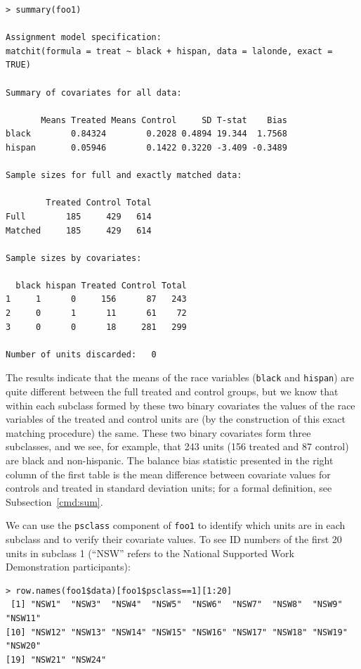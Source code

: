 \documentclass[oneside,letterpaper,titlepage]{article}
\begin{document}
\begin{verbatim}
> summary(foo1)
 
Assignment model specification:
matchit(formula = treat ~ black + hispan, data = lalonde, exact = TRUE)
 
Summary of covariates for all data:
 
       Means Treated Means Control     SD T-stat    Bias
black        0.84324        0.2028 0.4894 19.344  1.7568
hispan       0.05946        0.1422 0.3220 -3.409 -0.3489
  
Sample sizes for full and exactly matched data:
 
        Treated Control Total
Full        185     429   614
Matched     185     429   614
 
Sample sizes by covariates:
 
  black hispan Treated Control Total
1     1      0     156      87   243
2     0      1      11      61    72
3     0      0      18     281   299
 
Number of units discarded:   0
\end{verbatim}
The results indicate that the means of the race variables ({\tt black}
and {\tt hispan}) are quite different between the full treated and
control groups, but we know that within each subclass formed by these
two binary covariates the values of the race variables of the treated
and control units are (by the construction of this exact matching
procedure) the same.  These two binary covariates form three
subclasses, and we see, for example, that 243 units (156 treated and
87 control) are black and non-hispanic.  The balance bias statistic
presented in the right column of the first table is the mean
difference between covariate values for controls and treated in
standard deviation units; for a formal definition, see
Subsection~\ref{cmd:sum}.

We can use the {\tt psclass} component of {\tt foo1} to identify which
units are in each subclass and to verify their covariate values.
To see ID numbers of the first 20 units in subclass 1 (``NSW'' refers
to the National Supported Work Demonstration participants):
\begin{verbatim}
> row.names(foo1$data)[foo1$psclass==1][1:20]
 [1] "NSW1"  "NSW3"  "NSW4"  "NSW5"  "NSW6"  "NSW7"  "NSW8"  "NSW9"  "NSW11"
[10] "NSW12" "NSW13" "NSW14" "NSW15" "NSW16" "NSW17" "NSW18" "NSW19" "NSW20"
[19] "NSW21" "NSW24"
\end{verbatim}
\end{document}
